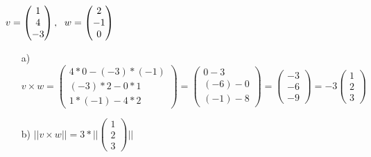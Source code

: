 \subsection{}
\begin{math}
    v=\begin{pmatrix}
        1\\
        4\\
        -3
    \end{pmatrix},
    \hspace{6px}
    w=\begin{pmatrix}
        2\\
        -1\\
        0
    \end{pmatrix}
\end{math}
\begin{enumerate}
    \item[a)]
        \begin{math}
            v\times w
            =\begin{pmatrix}
                4*0-(-3)*(-1)\\
                (-3)*2-0*1\\
                1*(-1)-4*2
            \end{pmatrix}
            =\begin{pmatrix}
                0-3\\
                (-6)-0\\
                (-1)-8
            \end{pmatrix}
            =\begin{pmatrix}
                -3\\
                -6\\
                -9
            \end{pmatrix}
            =-3\begin{pmatrix}
                1\\
                2\\
                3
            \end{pmatrix}
        \end{math}
    \item[b)]
        \begin{math}
            ||v\times w||
            =3*||\begin{pmatrix}
                1\\
                2\\
                3
            \end{pmatrix}||

\end{math}
\end{enumerate}
